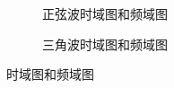 \begin{figure}[htpb]
	\centering
	\begin{subfigure}[htpb]{.45\linewidth}
		\centering
		\caption{正弦波时域图和频域图}
		\label{fig:正弦波时域图和频域图}
	\end{subfigure}
	\quad
	\begin{subfigure}[htpb]{.45\linewidth}
		\centering
		\caption{三角波时域图和频域图}
		\label{fig:三角波时域图和频域图}
	\end{subfigure}
	\quad
	\caption{时域图和频域图}
	\label{fig:时域图和频域图}
\end{figure}

